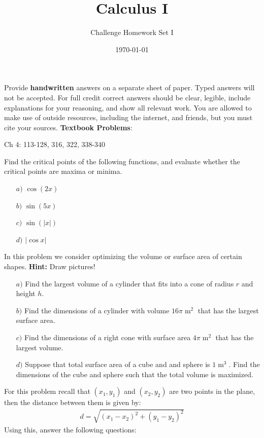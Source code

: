\documentclass[parskip=full]{scrartcl}
\title{Calculus I}
\subtitle{Challenge Homework Set I}
\author{}
\date{\today}
\numberwithin{equation}{section}
\theoremstyle{definition}
\begin{document}
\maketitle
Provide \textbf{handwritten} answers on a separate sheet of paper. Typed answers will not be accepted.
For full credit correct answers should be clear, legible, include explanations for your reasoning, and 
show all relevant work. You are allowed to make use of outside resources, including the internet, and
friends, but you must cite your sources.
\textbf{Textbook Problems}:

Ch 4: 113-128, 316,  322, 338-340
\begin{problems}
  \item Find the critical points of the following functions, and evaluate whether the 
  critical points are maxima or minima. 
  \begin{itemize}
    \item [$a)$]$\cos (2x)$
    \item [$b)$] $\sin (5x)$
    \item [$c)$] $\sin (|x|)$
    \item [$d)$] $|\cos x|$
  \end{itemize}
  \item In this problem we consider optimizing the volume or surface area of certain shapes. \textbf{Hint:} Draw pictures!
  \begin{itemize}
    \item [$a)$] Find the largest volume of a cylinder that fits into a cone of radius $r$ 
    and height $h$.
    \item [$b)$] Find the dimensions of a cylinder with volume $16\pi\operatorname{m}^2$ that has the largest surface area.
    \item [$c)$] Find the dimensions of a right cone with surface area $4\pi\operatorname{m}^2$ that has the largest volume.
    \item [$d)$] Suppose that total surface area of a cube and and sphere is $1\operatorname{m}^3$. Find the dimensions 
    of the cube and sphere such that the total volume is maximized.
  \end{itemize}
  \item For this problem recall that $(x_1,y_1)$ and $(x_2,y_2)$ are two points in the plane, then the 
  distance between them is given by:
  \begin{align*}
    d=\sqrt{(x_1-x_2)^2+(y_1-y_2)^2}
  \end{align*}
  Using this, answer the following questions:

\end{problems}
\end{document}
